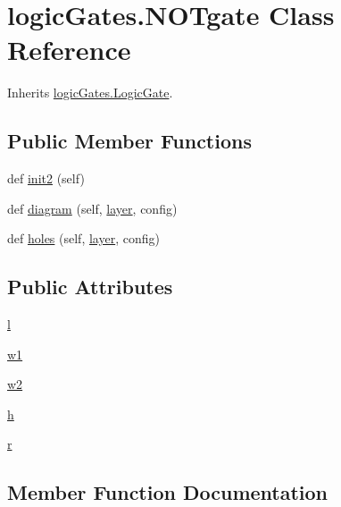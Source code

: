 \hypertarget{classlogic_gates_1_1_n_o_tgate}{}\section{logic\+Gates.\+N\+O\+Tgate Class Reference}
\label{classlogic_gates_1_1_n_o_tgate}


Inherits \hyperlink{classlogic_gates_1_1_logic_gate}{logic\+Gates.\+Logic\+Gate}.

\subsection*{Public Member Functions}
\begin{DoxyCompactItemize}
\item 
def \hyperlink{classlogic_gates_1_1_n_o_tgate_a89d6729ade6b87de39b2c9c9736c67a8}{init2} (self)
\item 
def \hyperlink{classlogic_gates_1_1_n_o_tgate_a7f8952528e28c7162211934b854db02a}{diagram} (self, \hyperlink{classpath_1_1_part_aa1d9912dfa1d7e3222df898d2a18786f}{layer}, config)
\item 
def \hyperlink{classlogic_gates_1_1_n_o_tgate_a2e42e5d7851e2b09877e076564f41ed1}{holes} (self, \hyperlink{classpath_1_1_part_aa1d9912dfa1d7e3222df898d2a18786f}{layer}, config)
\end{DoxyCompactItemize}
\subsection*{Public Attributes}
\begin{DoxyCompactItemize}
\item 
\hyperlink{classlogic_gates_1_1_n_o_tgate_ab47a320e872d79c3f1e37f57d05ce7c1}{l}
\item 
\hyperlink{classlogic_gates_1_1_n_o_tgate_aa5e10a5bdbf9f08eda14cd29a24c441d}{w1}
\item 
\hyperlink{classlogic_gates_1_1_n_o_tgate_ae6ee30c79e4d96547825e82bd0aec53f}{w2}
\item 
\hyperlink{classlogic_gates_1_1_n_o_tgate_afc9d219c6fc7e218b0ef26bd21adbd8f}{h}
\item 
\hyperlink{classlogic_gates_1_1_n_o_tgate_adb710f70194af197f3f8a1d34c90a8a4}{r}
\end{DoxyCompactItemize}


\subsection{Member Function Documentation}
\hypertarget{classlogic_gates_1_1_n_o_tgate_a7f8952528e28c7162211934b854db02a}{}
